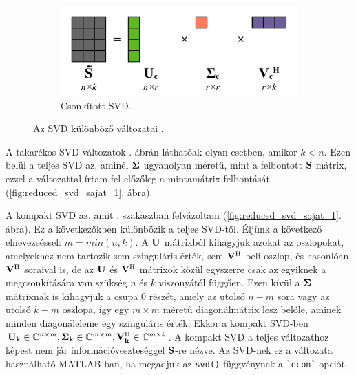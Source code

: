 \begin{figure}[h!]
                \begin{subfigure}{0.48\textwidth}
                    \includegraphics[width=\textwidth]{kep/reduced_svd_sajat_4.pdf}
                    \caption{Csonkított SVD.}
                    \label{fig:reduced_svd_sajat_4}
                \end{subfigure}
                \caption{Az SVD különböző változatai \cite{WikipediaSVD}.}
                \label{fig:reduced_svd_sajat}
            \end{figure}
            A takarékos SVD változatok . ábrán láthatóak olyan esetben, amikor $k < n$. Ezen belül a teljes SVD az, aminél ${\bf \Sigma}$ ugyanolyan méretű, mint a felbontott ${\bf S}$ mátrix, ezzel a változattal írtam fel előzőleg a mintamátrix felbontását (\ref{fig:reduced_svd_sajat_1}. ábra).
            \par
            A kompakt SVD az, amit . szakaszban felvázoltam (\ref{fig:reduced_svd_sajat_1}. ábra). Ez a következőkben különbözik a teljes SVD-től. Éljünk a következő elnevezeéssel: $m=min(n,k)$. A ${\bf U}$ mátrixból kihagyjuk azokat az oszlopokat, amelyekhez nem tartozik sem szinguláris érték, sem ${\bf V^{\mathrm{H}}}$-beli oszlop, és hasonlóan ${\bf V^{\mathrm{H}}}$ soraival is, de az ${\bf U}$ és ${\bf V^{\mathrm{H}}}$ mátrixok közül egyszerre csak az egyiknek a megcsonkítására van szükség $n$ és $k$ viszonyától függően. Ezen kívül a ${\bf \Sigma}$ mátrixnak is kihagyjuk a csupa 0 részét, amely az utolsó $n-m$ sora vagy az utolsó $k-m$ oszlopa, így egy $m \times m$ méretű diagonálmátrix lesz belőle, aminek minden diagonáleleme egy szinguláris érték. Ekkor a kompakt SVD-ben ${\bf U_k} \in \mathbb{C}^{n\times m}, {\bf\Sigma_k} \in \mathbb{C}^{m\times m}, {\bf V_k^{\mathrm{H}}} \in \mathbb{C}^{m\times k}$. A kompakt SVD a teljes változathoz képest nem jár információveszteséggel ${\bf S}$-re nézve. Az SVD-nek ez a változata használható MATLAB-ban, ha megadjuk az \verb|svd()| függvénynek a \verb|`econ`| opciót.
